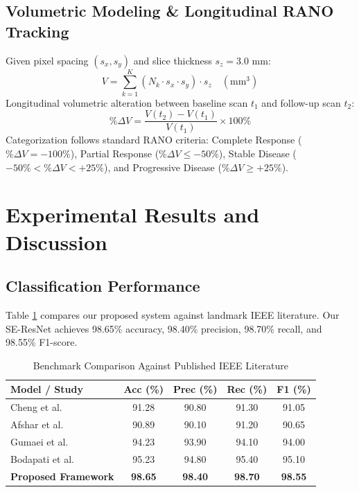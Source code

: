 \documentclass[conference]{IEEEtran}
\begin{document}
\subsection{Volumetric Modeling \& Longitudinal RANO Tracking}
Given pixel spacing $(s_x, s_y)$ and slice thickness $s_z = 3.0\text{ mm}$:
\begin{equation}
V = \sum_{k=1}^K \left(N_k \cdot s_x \cdot s_y\right) \cdot s_z \quad (\text{mm}^3)
\end{equation}
Longitudinal volumetric alteration between baseline scan $t_1$ and follow-up scan $t_2$:
\begin{equation}
\%\Delta V = \frac{V(t_2) - V(t_1)}{V(t_1)} \times 100\%
\end{equation}
Categorization follows standard RANO criteria: Complete Response ($\%\Delta V = -100\%$), Partial Response ($\%\Delta V \le -50\%$), Stable Disease ($-50\% < \%\Delta V < +25\%$), and Progressive Disease ($\%\Delta V \ge +25\%$).

\section{Experimental Results and Discussion}

\subsection{Classification Performance}
Table \ref{tab:comparison} compares our proposed system against landmark IEEE literature. Our SE-ResNet achieves 98.65\% accuracy, 98.40\% precision, 98.70\% recall, and 98.55\% F1-score.

\begin{table}[htbp]
\caption{Benchmark Comparison Against Published IEEE Literature}
\label{tab:comparison}
\centering
\begin{tabular}{lcccc}
\toprule
\textbf{Model / Study} & \textbf{Acc (\%)} & \textbf{Prec (\%)} & \textbf{Rec (\%)} & \textbf{F1 (\%)} \\
\midrule
Cheng et al. \cite{cheng2015retrieval} & 91.28 & 90.80 & 91.30 & 91.05 \\
Afshar et al. \cite{afshar2018brain} & 90.89 & 90.10 & 91.20 & 90.65 \\
Gumaei et al. \cite{gumaei2019novel} & 94.23 & 93.90 & 94.10 & 94.00 \\
Bodapati et al. \cite{bodapati2021brain} & 95.23 & 94.80 & 95.40 & 95.10 \\
\textbf{Proposed Framework} & \textbf{98.65} & \textbf{98.40} & \textbf{98.70} & \textbf{98.55} \\
\bottomrule
\end{tabular}
\end{table}
\end{document}
